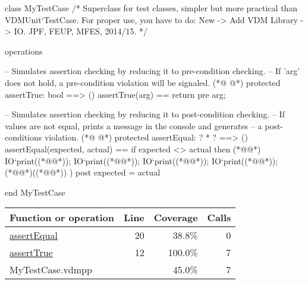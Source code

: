 \begin{vdmpp}[breaklines=true]
class MyTestCase
/*
  Superclass for test classes, simpler but more practical than VDMUnit`TestCase. 
  For proper use, you have to do: New -> Add VDM Library -> IO.
  JPF, FEUP, MFES, 2014/15.
*/

operations

 -- Simulates assertion checking by reducing it to pre-condition checking.
 -- If 'arg' does not hold, a pre-condition violation will be signaled.
(*@
\label{assertTrue:12}
@*)
 protected assertTrue: bool ==> ()
 assertTrue(arg) == 
  return 
 pre arg;
  
 -- Simulates assertion checking by reducing it to post-condition checking.
 -- If values are not equal, prints a message in the console and generates 
 -- a post-conditions violation.
(*@
\label{assertEqual:20}
@*)
 protected assertEqual: ? * ? ==> ()
 assertEqual(expected, actual) == 
  if expected <> actual then (*@\vdmnotcovered{(}@*)
     IO`print((*@@*));
     IO`print((*@@*)); 
     IO`print((*@@*));
     IO`print((*@@*));
     (*@@*)((*@@*))
  )
 post expected = actual
  
end MyTestCase
\end{vdmpp}
\bigskip
\begin{longtable}{|l|r|r|r|}
\hline
Function or operation & Line & Coverage & Calls \\
\hline
\hline
\hyperref[assertEqual:20]{assertEqual} & 20&38.8\% & 0 \\
\hline
\hyperref[assertTrue:12]{assertTrue} & 12&100.0\% & 7 \\
\hline
\hline
MyTestCase.vdmpp & & 45.0\% & 7 \\
\hline
\end{longtable}

